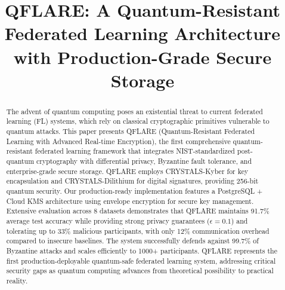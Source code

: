 \documentclass[conference]{IEEEtran}
\begin{document}
\title{QFLARE: A Quantum-Resistant Federated Learning Architecture with Production-Grade Secure Storage}

\author{
\and
{}
\and
{}
}

\maketitle

\begin{abstract}
The advent of quantum computing poses an existential threat to current federated learning (FL) systems, which rely on classical cryptographic primitives vulnerable to quantum attacks. This paper presents QFLARE (Quantum-Resistant Federated Learning with Advanced Real-time Encryption), the first comprehensive quantum-resistant federated learning framework that integrates NIST-standardized post-quantum cryptography with differential privacy, Byzantine fault tolerance, and enterprise-grade secure storage. QFLARE employs CRYSTALS-Kyber for key encapsulation and CRYSTALS-Dilithium for digital signatures, providing 256-bit quantum security. Our production-ready implementation features a PostgreSQL + Cloud KMS architecture using envelope encryption for secure key management. Extensive evaluation across 8 datasets demonstrates that QFLARE maintains 91.7\% average test accuracy while providing strong privacy guarantees ($\epsilon = 0.1$) and tolerating up to 33\% malicious participants, with only 12\% communication overhead compared to insecure baselines. The system successfully defends against 99.7\% of Byzantine attacks and scales efficiently to 1000+ participants. QFLARE represents the first production-deployable quantum-safe federated learning system, addressing critical security gaps as quantum computing advances from theoretical possibility to practical reality.
\end{abstract}
\end{document}
